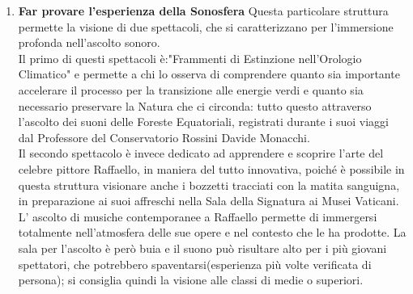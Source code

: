 \documentclass[hidelinks,12pt,a4paper]{article}
\begin{document}
\begin{flushleft}
\begin{enumerate}
\begin{adjustwidth}{-30mm}{0mm}
\begin{minipage}{\linewidth}
\begin{minipage}[t] {0.4\linewidth}
					\end{minipage}
				\end{minipage}
			\end{adjustwidth}
	
			\item \textbf{Far provare l'esperienza della Sonosfera}
			Questa particolare struttura permette la visione di due spettacoli, che si caratterizzano per l'immersione profonda nell'ascolto sonoro.\\
			Il primo di questi spettacoli è:"Frammenti di Estinzione nell'Orologio Climatico" e permette a chi lo osserva di comprendere quanto sia importante accelerare il processo per la transizione alle energie verdi e quanto sia necessario preservare la Natura che ci circonda: tutto questo attraverso l'ascolto dei suoni delle Foreste Equatoriali, registrati durante i suoi viaggi dal Professore del Conservatorio Rossini Davide Monacchi.\\
			Il secondo spettacolo è invece dedicato ad apprendere e scoprire l'arte del celebre pittore Raffaello, in maniera del tutto innovativa, poiché è possibile in questa struttura visionare anche i bozzetti tracciati con la matita sanguigna, in preparazione ai suoi affreschi nella Sala della Signatura ai Musei Vaticani.\\
			L' ascolto di musiche contemporanee a Raffaello permette di immergersi totalmente nell'atmosfera delle sue opere e nel contesto che le ha prodotte. La sala per l'ascolto è però buia e il suono può risultare alto per i più giovani spettatori, che potrebbero spaventarsi(esperienza più volte verificata di persona); si consiglia quindi la visione alle classi di medie o superiori.
			\end{enumerate}
			\newpage
			\listoffigures

			\vspace*{\fill}
			\doclicenseThis
	\end{flushleft}
\end{document}
